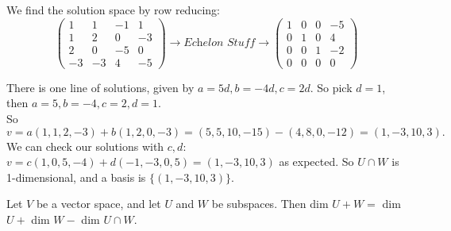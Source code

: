 \begin{examples}
We find the solution space by row reducing:
\[
\begin{pmatrix}
1 & 1 & -1 & 1\\
1 & 2 & 0 & -3\\
2 & 0 & -5 & 0\\
-3 & -3 & 4 & -5
\end{pmatrix} \rightarrow \textit{Echelon Stuff} \rightarrow
 \begin{pmatrix}
 1 & 0 & 0 & -5\\
 0 & 1 & 0 & 4\\
 0 & 0 & 1 & -2\\
 0 & 0 & 0 & 0
 \end{pmatrix}  \]

There is one line of solutions, given by $a = 5d, b = -4d, c = 2d.$ So pick $d = 1$, then $a = 5, b = -4, c = 2, d =1$.\\ 

So $v = a(1,1,2,-3) + b(1,2,0,-3) = (5,5,10,-15) - (4,8,0,-12) = (1,-3,10,3).$\\

We can check our solutions with $c,d$: $v = c(1,0,5,-4) + d(-1,-3,0,5) = (1,-3,10,3)$ as expected. So $U \cap W$ is 1-dimensional, and a basis is $\{(1,-3,10,3)\}$.
\end{examples}


\begin{theorem} Let $V$ be a vector space, and let $U$ and $W$ be subspaces. Then dim $U + W = $ dim $U + $ dim $W - $ dim $U \cap W$.	
\end{theorem}


